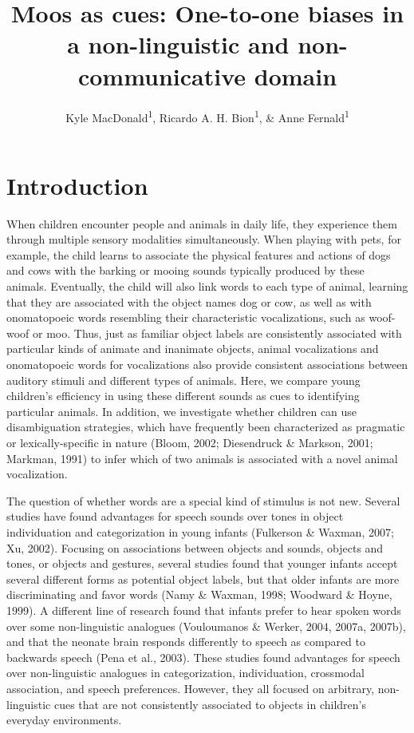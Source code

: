 \documentclass[english,floatsintext,man]{apa6}
\title{Moos as cues: One-to-one biases in a non-linguistic and
non-communicative domain}
\author{Kyle MacDonald\textsuperscript{1}, Ricardo A. H. Bion\textsuperscript{1}, \& Anne Fernald\textsuperscript{1}}
\affiliation{
    \vspace{0.5cm}
          \textsuperscript{1} Stanford University  }
\theoremstyle{definition}
\theoremstyle{definition}
\theoremstyle{definition}
\theoremstyle{remark}
\begin{document}
\maketitle

\setcounter{secnumdepth}{0}



\hypertarget{introduction}{%
\section{Introduction}\label{introduction}}

When children encounter people and animals in daily life, they
experience them through multiple sensory modalities simultaneously. When
playing with pets, for example, the child learns to associate the
physical features and actions of dogs and cows with the barking or
mooing sounds typically produced by these animals. Eventually, the child
will also link words to each type of animal, learning that they are
associated with the object names dog or cow, as well as with
onomatopoeic words resembling their characteristic vocalizations, such
as woof-woof or moo. Thus, just as familiar object labels are
consistently associated with particular kinds of animate and inanimate
objects, animal vocalizations and onomatopoeic words for vocalizations
also provide consistent associations between auditory stimuli and
different types of animals. Here, we compare young children's efficiency
in using these different sounds as cues to identifying particular
animals. In addition, we investigate whether children can use
disambiguation strategies, which have frequently been characterized as
pragmatic or lexically-specific in nature (Bloom, 2002; Diesendruck \&
Markson, 2001; Markman, 1991) to infer which of two animals is
associated with a novel animal vocalization.

The question of whether words are a special kind of stimulus is not new.
Several studies have found advantages for speech sounds over tones in
object individuation and categorization in young infants (Fulkerson \&
Waxman, 2007; Xu, 2002). Focusing on associations between objects and
sounds, objects and tones, or objects and gestures, several studies
found that younger infants accept several different forms as potential
object labels, but that older infants are more discriminating and favor
words (Namy \& Waxman, 1998; Woodward \& Hoyne, 1999). A different line
of research found that infants prefer to hear spoken words over some
non-linguistic analogues (Vouloumanos \& Werker, 2004, 2007a, 2007b),
and that the neonate brain responds differently to speech as compared to
backwards speech (Pena et al., 2003). These studies found advantages for
speech over non-linguistic analogues in categorization, individuation,
crossmodal association, and speech preferences. However, they all
focused on arbitrary, non-linguistic cues that are not consistently
associated to objects in children's everyday environments.
\end{document}
